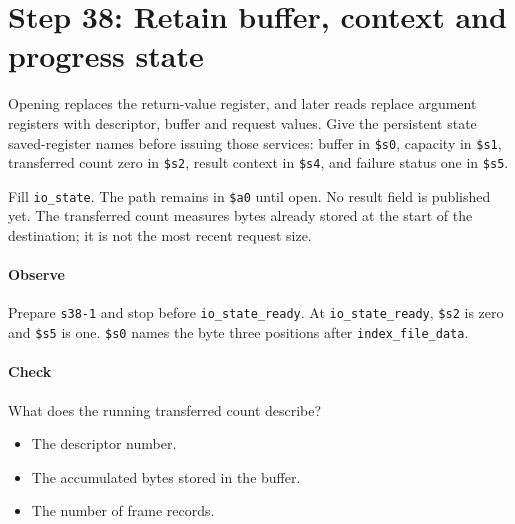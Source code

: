 \section{Step 38: Retain buffer, context and progress state}
Opening replaces the return-value register, and later reads replace argument
registers with descriptor, buffer and request values. Give the persistent state
saved-register names before issuing those services: buffer in \texttt{\$s0},
capacity in \texttt{\$s1}, transferred count zero in \texttt{\$s2}, result
context in \texttt{\$s4}, and failure status one in \texttt{\$s5}.

Fill \texttt{io\_state}. The path remains in \texttt{\$a0} until open. No
result field is published yet. The transferred count measures bytes already
stored at the start of the destination; it is not the most recent request size.

\paragraph{Observe} Prepare \texttt{s38-1} and stop before
\texttt{io\_state\_ready}. At \texttt{io\_state\_ready}, \texttt{\$s2} is zero and
\texttt{\$s5} is one. \texttt{\$s0} names the byte three positions after
\texttt{index\_file\_data}.

\paragraph{Check} What does the running transferred count describe?
\begin{itemize}
  \item[A.] The descriptor number.
  \item[B.] The accumulated bytes stored in the buffer.
  \item[C.] The number of frame records.
\end{itemize}
